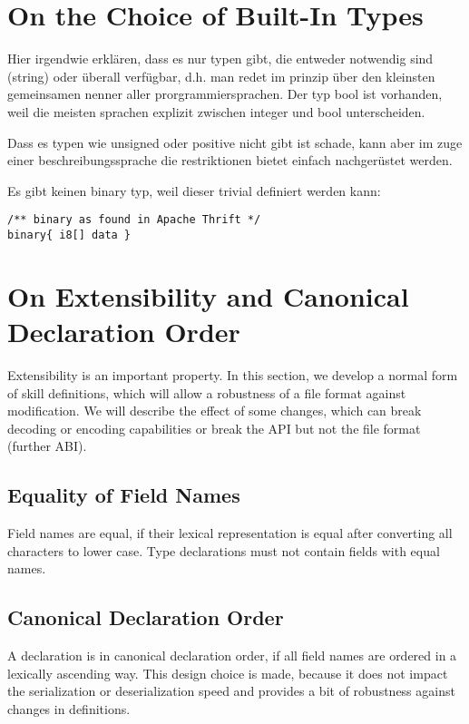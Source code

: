 \documentclass[a4paper,10pt]{article}
\begin{document}
\section{On the Choice of Built-In Types}

Hier irgendwie erklären, dass es nur typen gibt, die entweder notwendig sind (string) oder überall verfügbar, d.h. man redet im prinzip über den kleinsten gemeinsamen nenner aller prorgrammiersprachen. Der typ bool ist vorhanden, weil die meisten sprachen explizit zwischen integer und bool unterscheiden.

Dass es typen wie unsigned oder positive nicht gibt ist schade, kann aber im zuge einer beschreibungssprache die restriktionen bietet einfach nachgerüstet werden.

Es gibt keinen binary typ, weil dieser trivial definiert werden kann:
\begin{verbatim}
/** binary as found in Apache Thrift */
binary{ i8[] data }
\end{verbatim}


\section{On Extensibility and Canonical Declaration Order}

Extensibility is an important property. In this section, we develop a normal form of skill definitions, which will allow a robustness of a file format against modification. We will describe the effect of some changes, which can break decoding or encoding capabilities or break the API but not the file format (further ABI).

\subsection{Equality of Field Names}

Field names are equal, if their lexical representation is equal after converting all characters to lower case. Type declarations must not contain fields with equal names.

\subsection{Canonical Declaration Order}

A declaration is in canonical declaration order, if all field names are ordered in a lexically ascending way. This design choice is made, because it does not impact the serialization or deserialization speed and provides a bit of robustness against changes in definitions.
\end{document}
